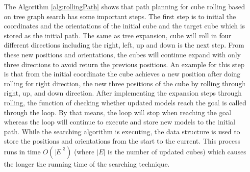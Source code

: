 \noindent The Algorithm \ref{alg:rollingPath} shows that path planning for cube rolling based on tree graph search has some important steps. The first step is to initial the coordinates and the orientations of the initial cube and the target cube which is stored as the initial path. The same as tree expansion, cube will roll in four different directions including the right, left, up and down is the next step. From these new positions and orientations, the cubes will continue expand with only three directions to avoid return the previous positions. An example for this step is that from the initial coordinate the cube achieves a new position after doing rolling for right direction, the new three positions of the cube by rolling through right, up, and down direction. After implementing the expansion steps through rolling, the function of checking whether updated models reach the goal is called through the loop. By that means, the loop will stop when reaching the goal whereas the loop will continue to execute and store new models to the initial path. While the searching algorithm is executing, the data structure is used to store the positions and orientations from the start to the current. This process runs in time $O(|E|^3)$ (where $|E|$ is the number of updated cubes) which causes the longer the running time of the searching technique. \\

